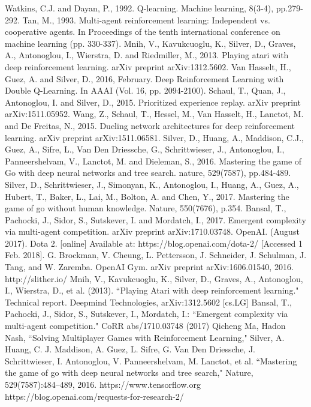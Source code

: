 \documentclass[conference]{IEEEtran}
\begin{document}
\begin{thebibliography}{00}
 Watkins, C.J. and Dayan, P., 1992. Q-learning. Machine learning, 8(3-4), pp.279-292.
 Tan, M., 1993. Multi-agent reinforcement learning: Independent vs. cooperative agents. In Proceedings of the tenth international conference on machine learning (pp. 330-337).
 Mnih, V., Kavukcuoglu, K., Silver, D., Graves, A., Antonoglou, I., Wierstra, D. and Riedmiller, M., 2013. Playing atari with deep reinforcement learning. arXiv preprint arXiv:1312.5602.
 Van Hasselt, H., Guez, A. and Silver, D., 2016, February. Deep Reinforcement Learning with Double Q-Learning. In AAAI (Vol. 16, pp. 2094-2100).
 Schaul, T., Quan, J., Antonoglou, I. and Silver, D., 2015. Prioritized experience replay. arXiv preprint arXiv:1511.05952.
 Wang, Z., Schaul, T., Hessel, M., Van Hasselt, H., Lanctot, M. and De Freitas, N., 2015. Dueling network architectures for deep reinforcement learning. arXiv preprint arXiv:1511.06581.
 Silver, D., Huang, A., Maddison, C.J., Guez, A., Sifre, L., Van Den Driessche, G., Schrittwieser, J., Antonoglou, I., Panneershelvam, V., Lanctot, M. and Dieleman, S., 2016. Mastering the game of Go with deep neural networks and tree search. nature, 529(7587), pp.484-489.
 Silver, D., Schrittwieser, J., Simonyan, K., Antonoglou, I., Huang, A., Guez, A., Hubert, T., Baker, L., Lai, M., Bolton, A. and Chen, Y., 2017. Mastering the game of go without human knowledge. Nature, 550(7676), p.354.
 Bansal, T., Pachocki, J., Sidor, S., Sutskever, I. and Mordatch, I., 2017. Emergent complexity via multi-agent competition. arXiv preprint arXiv:1710.03748.
 OpenAI. (August 2017). Dota 2. [online] Available at: https://blog.openai.com/dota-2/ [Accessed 1 Feb. 2018].
 G. Brockman, V. Cheung, L. Pettersson, J. Schneider, J. Schulman, J. Tang, and W. Zaremba. OpenAI
Gym. arXiv preprint arXiv:1606.01540, 2016.
 http://slither.io/
 Mnih, V., Kavukcuoglu, K., Silver, D., Graves, A., Antonoglou, I., Wierstra, D., et al. (2013). ``Playing Atari with deep reinforcement learning." Technical report. Deepmind Technologies, arXiv:1312.5602 [cs.LG]
 Bansal, T., Pachocki, J., Sidor, S., Sutskever, I., Mordatch, I.: ``Emergent complexity
via multi-agent competition." CoRR abs/1710.03748 (2017)
 Qicheng Ma, Hadon Nash, ``Solving Multiplayer Games with Reinforcement Learning,"
 Silver, A. Huang, C. J. Maddison, A. Guez, L. Sifre, G. Van Den Driessche, J. Schrittwieser, I. Antonoglou, V. Panneershelvam, M. Lanctot, et al. ``Mastering the game of go with deep neural networks and tree search," Nature, 529(7587):484–489, 2016.
https://www.tensorflow.org
 {https://blog.openai.com/requests-for-research-2/}
\end{thebibliography}
\end{document}
